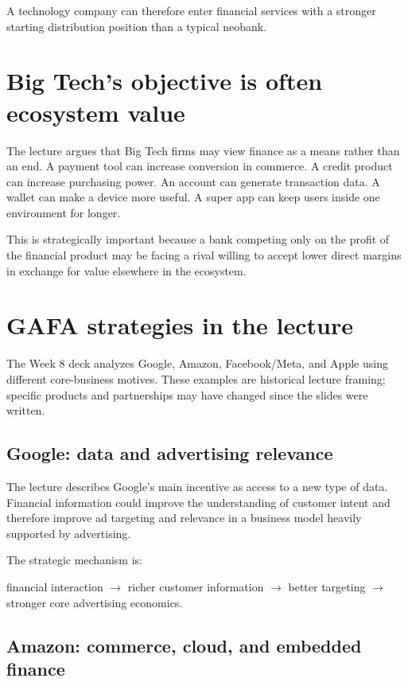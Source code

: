 A technology company can therefore enter financial services with a stronger starting distribution position than a typical neobank.

\section{Big Tech's objective is often ecosystem value}

The lecture argues that Big Tech firms may view finance as a means rather than an end. A payment tool can increase conversion in commerce. A credit product can increase purchasing power. An account can generate transaction data. A wallet can make a device more useful. A super app can keep users inside one environment for longer.

This is strategically important because a bank competing only on the profit of the financial product may be facing a rival willing to accept lower direct margins in exchange for value elsewhere in the ecosystem.

\section{GAFA strategies in the lecture}

The Week 8 deck analyzes Google, Amazon, Facebook/Meta, and Apple using different core-business motives. These examples are historical lecture framing; specific products and partnerships may have changed since the slides were written.

\subsection{Google: data and advertising relevance}

The lecture describes Google's main incentive as access to a new type of data. Financial information could improve the understanding of customer intent and therefore improve ad targeting and relevance in a business model heavily supported by advertising.

The strategic mechanism is:

\begin{center}
financial interaction $\rightarrow$ richer customer information $\rightarrow$ better targeting $\rightarrow$ stronger core advertising economics.
\end{center}

\subsection{Amazon: commerce, cloud, and embedded finance}

